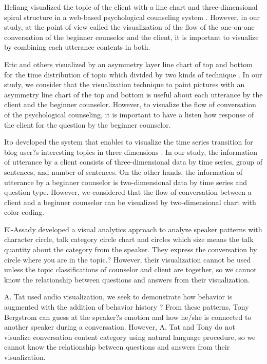 \documentclass[review]{elsarticle}
\begin{document}
Heliang visualized the topic of the client with a line chart and three-dimensional spiral structure in a web-based psychological counseling system \cite{shou}. However, in our study, at the point of view called the visualization of the flow of the one-on-one conversation of the beginner counselor and the client, it is important to visualize by combining each utterance contents in both. 

  Eric and others visualized by an asymmetry layer line chart of top and bottom for the time distribution of topic which divided by two kinds of technique \cite{taskdriven}. In our study, we consider that the visualization technique to paint pictures with an asymmetry line chart of the top and bottom is useful about each utterance by the client and the beginner counselor. However, to visualize the flow of conversation of the psychological counseling, it is important to have a listen how response of the client for the question by the beginner counselor. 

  Ito developed the system that enables to visualize the time series transition for blog user?s interesting topics in three dimensions \cite{itoh2010interactive}. In our study, the information of utterance by a client consists of three-dimensional data by time series, group of sentences, and number of sentences. On the other hands, the information of utterance by a beginner counselor is two-dimensional data by time series and question type. However, we considered that the flow of conversation between a client and a beginner counselor can be visualized by two-dimensional chart with color coding. 

   El-Assady\cite{el2016contovi} developed a visual analytics approach to analyze speaker patterns with character circle, talk category circle chart and circles which size means the talk quantity about the category from the speaker. They express the conversation by circle where you are in the topic.?
   However, their visualization cannot be used unless the topic classifications of counselor and client are together, so we cannot know the relationship between questions and answers from their visualization.

  A. Tat \cite{tat2002visualising} used audio visualization, we seek to demonstrate how behavior is augmented with the addition of behavior history
?
 From these patterns, Tony Bergstrom\cite{bergstrom2007seeing} can guess at the speaker?s emotion and how he/she is connected to another speaker during a conversation. However, A. Tat and Tony do not visualize conversation content category using natural language procedure, so we cannot know the relationship between questions and answers from their visualization.
\end{document}

